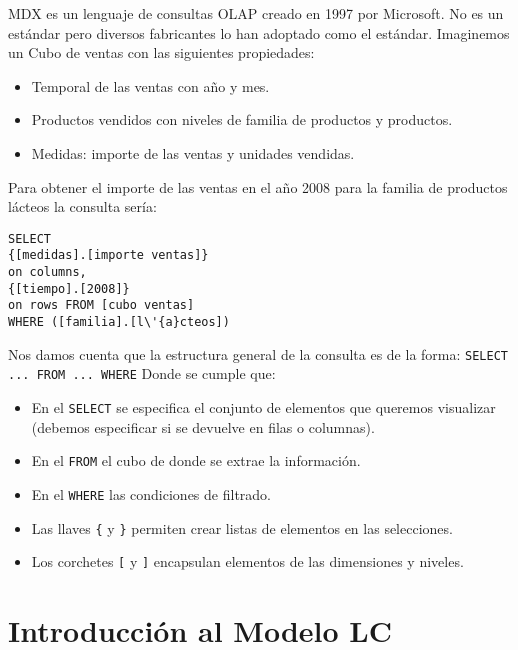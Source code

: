 \documentclass[DIV=calc, paper=a4, fontsize=11pt, twocolumn]{scrartcl}	 %
\begin{document}
MDX es un lenguaje de consultas OLAP creado en 1997 por Microsoft. No es un est\'{a}ndar pero diversos fabricantes lo han adoptado como el est\'{a}ndar. Imaginemos un Cubo de ventas con las siguientes propiedades:
\begin{itemize}
\item Temporal de las ventas con a\~{n}o y mes.
\item Productos vendidos con niveles de familia de productos y productos.
\item Medidas: importe de las ventas y unidades vendidas.
\end{itemize}
Para obtener el importe de las ventas en el a\~{n}o 2008 para la familia de productos l\'{a}cteos la consulta ser\'{i}a:
\begin{verbatim}
SELECT 
{[medidas].[importe ventas]}
on columns,
{[tiempo].[2008]}
on rows FROM [cubo ventas] 
WHERE ([familia].[l\'{a}cteos])
\end{verbatim}
Nos damos cuenta que la estructura general de la consulta es de la forma:
\texttt{SELECT ... FROM ... WHERE}
Donde se cumple que:
\begin{itemize}
\item En el \texttt{SELECT} se especifica el conjunto de elementos que queremos visualizar (debemos especificar si se devuelve en filas o columnas).
\item En el \texttt{FROM} el cubo de donde se extrae la informaci\'{o}n.
\item En el \texttt{WHERE} las condiciones de filtrado.
\item Las llaves \texttt{\{} y \texttt{\}} permiten crear listas de elementos en las selecciones.
\item Los corchetes \texttt{[} y \texttt{]} encapsulan elementos de las dimensiones y niveles.
\end{itemize}

\section*{Introducci\'{o}n al Modelo LC}
\end{document}
